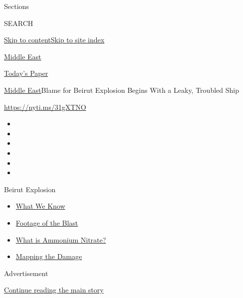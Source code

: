Sections

SEARCH

\protect\hyperlink{site-content}{Skip to
content}\protect\hyperlink{site-index}{Skip to site index}

\href{https://www.nytimes.com/section/world/middleeast}{Middle East}

\href{https://myaccount.nytimes.com/auth/login?response_type=cookie\&client_id=vi}{}

\href{https://www.nytimes.com/section/todayspaper}{Today's Paper}

\href{/section/world/middleeast}{Middle East}\textbar{}Blame for Beirut
Explosion Begins With a Leaky, Troubled Ship

\href{https://nyti.ms/31gXTNO}{https://nyti.ms/31gXTNO}

\begin{itemize}
\item
\item
\item
\item
\item
\item
\end{itemize}

Beirut Explosion

\begin{itemize}
\tightlist
\item
  \href{https://www.nytimes.com/2020/08/05/world/middleeast/beirut-explosion-what-happened.html?action=click\&pgtype=Article\&state=default\&region=TOP_BANNER\&context=storylines_menu}{What
  We Know}
\item
  \href{https://www.nytimes.com/2020/08/05/video/beirut-explosion-footage.html?action=click\&pgtype=Article\&state=default\&region=TOP_BANNER\&context=storylines_menu}{Footage
  of the Blast}
\item
  \href{https://www.nytimes.com/2020/08/05/world/middleeast/beirut-explosion-ammonium-nitrate.html?action=click\&pgtype=Article\&state=default\&region=TOP_BANNER\&context=storylines_menu}{What
  is Ammonium Nitrate?}
\item
  \href{https://www.nytimes.com/interactive/2020/08/04/world/middleeast/beirut-explosion-damage.html?action=click\&pgtype=Article\&state=default\&region=TOP_BANNER\&context=storylines_menu}{Mapping
  the Damage}
\end{itemize}

Advertisement

\protect\hyperlink{after-top}{Continue reading the main story}

